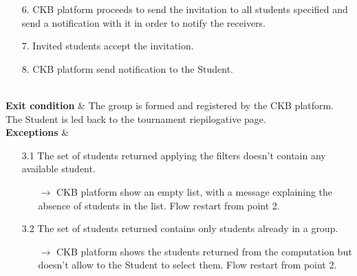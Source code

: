 \documentclass{article}
\begin{document}
{\begin{enumerate}
\begin{xltabular}{\textwidth}
\begin{enumerate}
                                                        \item[6.] CKB platform proceeds to send the invitation to all students
                                                        specified and send a notification with it in order to notify the receivers.
                                                        \item[7.] Invited students accept the invitation.
                                                        \item[8.] CKB platform send notification to the Student. 
                                                    \end{enumerate} \\
                        \hline
                        \textbf{Exit condition} & The group is formed and registered by the 
                        CKB platform. The Student is led back to the tournament riepilogative page.\\
                        \hline
                        \textbf{Exceptions} &    \begin{itemize}
                                                    \item[3.1] The set of students returned applying the filters
                                                    doesn't contain any available student.
                                                    \begin{itemize}
                                                        \item[$\rightarrow$] CKB platform show an empty list, with
                                                        a message explaining the absence of students in the list. Flow restart from point 2.
                                                    \end{itemize} 
                                                    \item[3.2] The set of students returned contains only students
                                                    already in a group.
                                                    \begin{itemize}
                                                        \item[$\rightarrow$] CKB platform shows the students returned
                                                        from the computation but doesn't allow to the Student to select them.
                                                        Flow restart from point 2.

\end{itemize}
\end{itemize}
\end{xltabular}
\end{enumerate}}
\end{document}
